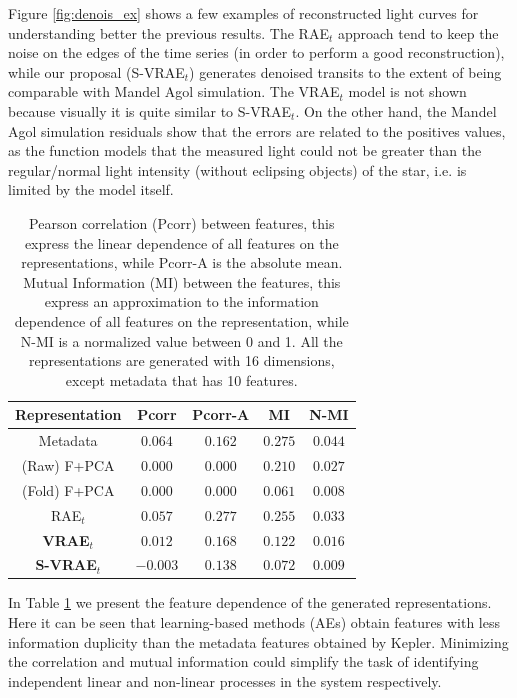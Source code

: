 Figure \ref{fig:denois_ex} shows a few examples of reconstructed light curves for understanding better the previous results. The RAE$_t$ approach tend to keep the noise on the edges of the time series (in order to perform a good reconstruction), while our proposal (S-VRAE$_t$) generates denoised transits to the extent of being comparable with Mandel Agol simulation. The VRAE$_t$ model is not shown because visually it is quite similar to S-VRAE$_t$.
On the other hand, the Mandel Agol simulation residuals show that the errors are related to the positives values, as the function models that the measured light could not be greater than the regular/normal light intensity (without eclipsing objects) of the star, i.e. is limited by the model itself.

\begin{table}[!t]
\caption{Pearson correlation (Pcorr) between features, this express the linear dependence of all features on the representations, while Pcorr-A is the absolute mean. Mutual Information (MI) between the features, this express an approximation to the information dependence of all features on the representation, while N-MI is a normalized value between 0 and 1. All the representations are generated with 16 dimensions, except metadata that has 10 features.}
\label{tab:feat_dep}
\centering
\begin{tabular}{c|cc|cc} \hline
\textbf{Representation} & \textbf{Pcorr} & \textbf{Pcorr-A} & \textbf{MI} & \textbf{N-MI} \\ \hline
Metadata     & $0.064$ & $0.162$ & $0.275$ & $0.044$ \\ \hline
(Raw) F+PCA  & $0.000$ & $0.000$ & $0.210$ & $0.027$ \\ %
(Fold) F+PCA & $0.000$ & $0.000$ & $0.061$ & $0.008$ \\ \hline
RAE$_t$  &  $0.057$ & $0.277$  & $0.255$ & $0.033$  \\ %
\textbf{VRAE$_t$}   &  $0.012$ & $0.168$ & $0.122$ & $0.016$   \\ %
\textbf{S-VRAE$_t$}   &  $-0.003$ & $0.138$ & $0.072$ & $0.009$  \\ \hline
\end{tabular}
\end{table}
In Table \ref{tab:feat_dep} we present the feature dependence of the generated representations. 
Here it can be seen that learning-based methods (AEs) obtain features with less information duplicity than the metadata features obtained by Kepler. Minimizing the correlation and mutual information could simplify the task of identifying independent linear and non-linear processes in the system respectively. 

